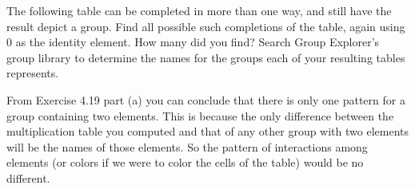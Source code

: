 \begin{questions}
\begin{solution}
	\end{solution}

	\question The following table can be completed in more than one way, and still have the result depict a group. Find all possible such completions of the table, again using $0$ as the identity element. How many did you find? Search Group Explorer's group library to determine the names for the groups each of your resulting tables represents.
	
	
	\question From Exercise 4.19 part (a) you can conclude that there is only one pattern for a group containing two elements. This is because the only difference between the multiplication table you computed and that of any other group with two elements will be the names of those elements. So the pattern of interactions among elements (or colors if we were to color the cells of the table) would be no different.
	

\end{questions}

